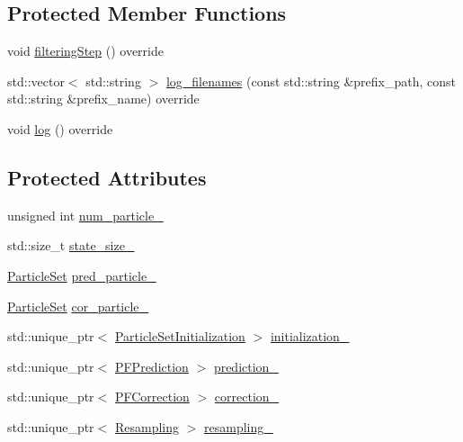 \subsection*{Protected Member Functions}
\begin{DoxyCompactItemize}
\item 
void \mbox{\hyperlink{classbfl_1_1SIS_a582f06cc5456d2cc6ed8f90087cbbb4c}{filtering\+Step}} () override
\item 
std\+::vector$<$ std\+::string $>$ \mbox{\hyperlink{classbfl_1_1SIS_a805aef60946bfcaae4f65473dc7bd5ae}{log\+\_\+filenames}} (const std\+::string \&prefix\+\_\+path, const std\+::string \&prefix\+\_\+name) override
\item 
void \mbox{\hyperlink{classbfl_1_1SIS_aeb0b87af1cc1fc4b616989ef489ecccc}{log}} () override
\end{DoxyCompactItemize}
\subsection*{Protected Attributes}
\begin{DoxyCompactItemize}
\item 
unsigned int \mbox{\hyperlink{classbfl_1_1SIS_a80c72cfbb1729fefd040f19bed41af8e}{num\+\_\+particle\+\_\+}}
\item 
std\+::size\+\_\+t \mbox{\hyperlink{classbfl_1_1SIS_a4b4789fd511416051baea5d78f882cff}{state\+\_\+size\+\_\+}}
\item 
\mbox{\hyperlink{classbfl_1_1ParticleSet}{Particle\+Set}} \mbox{\hyperlink{classbfl_1_1SIS_ae0990f026d4fcd9fcb4922647aedf5f0}{pred\+\_\+particle\+\_\+}}
\item 
\mbox{\hyperlink{classbfl_1_1ParticleSet}{Particle\+Set}} \mbox{\hyperlink{classbfl_1_1SIS_af35bb4dba4940cd7dcd292f7ac3644cc}{cor\+\_\+particle\+\_\+}}
\item 
std\+::unique\+\_\+ptr$<$ \mbox{\hyperlink{classbfl_1_1ParticleSetInitialization}{Particle\+Set\+Initialization}} $>$ \mbox{\hyperlink{classbfl_1_1ParticleFilter_aeb2120d4b99b0abc79ec3c2109952322}{initialization\+\_\+}}
\item 
std\+::unique\+\_\+ptr$<$ \mbox{\hyperlink{classbfl_1_1PFPrediction}{P\+F\+Prediction}} $>$ \mbox{\hyperlink{classbfl_1_1ParticleFilter_ab86f707d29a823423fe35de37e8f9d8e}{prediction\+\_\+}}
\item 
std\+::unique\+\_\+ptr$<$ \mbox{\hyperlink{classbfl_1_1PFCorrection}{P\+F\+Correction}} $>$ \mbox{\hyperlink{classbfl_1_1ParticleFilter_a691428357c812ba009e995175778c173}{correction\+\_\+}}
\item 
std\+::unique\+\_\+ptr$<$ \mbox{\hyperlink{classbfl_1_1Resampling}{Resampling}} $>$ \mbox{\hyperlink{classbfl_1_1ParticleFilter_a9b0b855942fa4fb847443b10fe26c589}{resampling\+\_\+}}
\end{DoxyCompactItemize}


